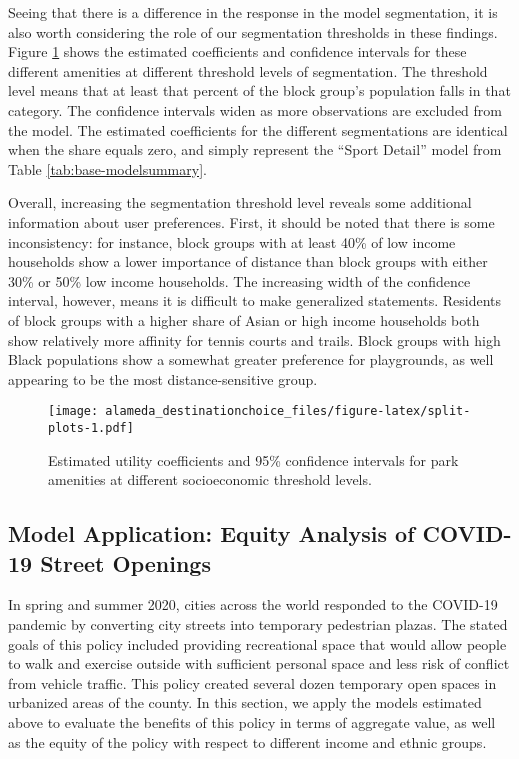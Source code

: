 \documentclass[3p, authoryear]{elsarticle} %
\makeatletter
\def\maxwidth{\ifdim\Gin@nat@width>\linewidth\linewidth
\else\Gin@nat@width\fi}
\let\Oldincludegraphics\includegraphics
\renewcommand{\includegraphics}[1]{\Oldincludegraphics[width=\maxwidth]{#1}}
\makeatother
\begin{document}
Seeing that there is a difference in the response in the model segmentation,
it is also worth considering the role of our segmentation thresholds in these
findings. Figure \ref{fig:split-plots} shows the estimated coefficients and
confidence intervals for these different amenities at different threshold levels
of segmentation. The threshold level means that at least that percent
of the block group's population falls in that category. The confidence intervals
widen as more observations are excluded from the model. The estimated coefficients
for the different segmentations are identical when the share equals zero, and
simply represent the ``Sport Detail'' model from Table \ref{tab:base-modelsummary}.

Overall, increasing the segmentation threshold level reveals some additional
information about user preferences. First, it should be noted that there is
some inconsistency: for instance, block groups with at least 40\% of low income
households show a lower importance of distance than block groups with either
30\% or 50\% low income households. The increasing width of the confidence interval,
however, means it is difficult to make generalized statements. Residents of
block groups with a higher share of Asian or high income households both show
relatively more affinity for tennis courts and trails. Block groups with high
Black populations show a somewhat greater preference for playgrounds, as well
appearing to be the most distance-sensitive group.

\begin{figure}
\centering
\texttt{[image: alameda\_destinationchoice\_files/figure-latex/split-plots-1.pdf]}
\caption{\label{fig:split-plots}Estimated utility coefficients and 95\% confidence intervals for park amenities at different socioeconomic threshold levels.}
\end{figure}

\hypertarget{model-application-equity-analysis-of-covid-19-street-openings}{%
\subsection{Model Application: Equity Analysis of COVID-19 Street Openings}\label{model-application-equity-analysis-of-covid-19-street-openings}}

In spring and summer 2020, cities across the world responded to the COVID-19
pandemic by converting city streets into temporary pedestrian plazas. The stated
goals of this policy included providing recreational space that would allow
people to walk and exercise outside with sufficient personal space and less risk
of conflict from vehicle traffic. This policy created several dozen temporary
open spaces in urbanized areas of the county. In this section, we apply the
models estimated above to evaluate the benefits of this policy in terms of
aggregate value, as well as the equity of the policy with respect to different
income and ethnic groups.
\end{document}
